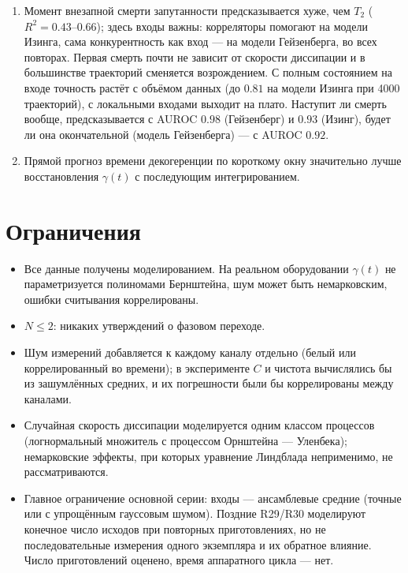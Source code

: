 \documentclass[12pt,a4paper]{report}
\numberwithin{equation}{chapter}
\begin{document}
\begin{enumerate}
      в вычислительном базисе скачком меняется при малом изменении
      будущей скорости, а $T_2^E$ меняется плавно.
\item Момент внезапной смерти запутанности предсказывается хуже, чем $T_2$
      ($R^2=0.43$--$0.66$); здесь входы важны: корреляторы помогают на
      модели Изинга, сама конкурентность как вход --- на модели
      Гейзенберга, во всех повторах. Первая смерть почти не зависит от
      скорости диссипации и в большинстве траекторий сменяется
      возрождением. С полным состоянием на входе точность растёт с
      объёмом данных (до $0.81$ на модели Изинга при 4000 траекторий), с
      локальными входами выходит на плато. Наступит ли смерть вообще,
      предсказывается с AUROC $0.98$ (Гейзенберг) и $0.93$ (Изинг), будет
      ли она окончательной (модель Гейзенберга) --- с AUROC $0.92$.
\item Прямой прогноз времени декогеренции по короткому окну значительно
      лучше восстановления $\gamma(t)$ с последующим интегрированием.
\end{enumerate}

\section{Ограничения}

\begin{itemize}
\item Все данные получены моделированием. На реальном оборудовании
      $\gamma(t)$ не параметризуется полиномами Бернштейна, шум может быть
      немарковским, ошибки считывания коррелированы.
\item $N\le2$: никаких утверждений о фазовом переходе.
\item Шум измерений добавляется к каждому каналу отдельно (белый или
      коррелированный во времени); в эксперименте $C$ и чистота
      вычислялись бы из зашумлённых средних, и их погрешности были бы
      коррелированы между каналами.
\item Случайная скорость диссипации моделируется одним классом процессов
      (логнормальный множитель с процессом Орнштейна --- Уленбека);
      немарковские эффекты, при которых уравнение Линдблада неприменимо,
      не рассматриваются.
\item Главное ограничение основной серии: входы --- ансамблевые средние
      (точные или с упрощённым гауссовым шумом). Поздние R29/R30 моделируют
      конечное число исходов при повторных приготовлениях, но не
      последовательные измерения одного экземпляра и их обратное влияние.
      Число приготовлений оценено, время аппаратного цикла --- нет.
\end{itemize}
\end{document}
